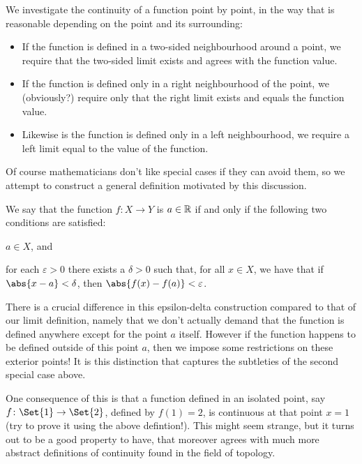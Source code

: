 We investigate the continuity of a function point by point, in the way that is reasonable depending on the point and its surrounding:
\begin{itemize}
	\item If the function is defined in a two-sided neighbourhood around a point, we require that the two-sided limit exists and agrees with the function value.
	\item If the function is defined only in a right neighbourhood of the point, we (obviously?) require only that the right limit exists and equals the function value.
	\item Likewise is the function is defined only in a left neighbourhood, we require a left limit equal to the value of the function.
\end{itemize}

\noindent
Of course mathematicians don't like special cases if they can avoid them, so we attempt to construct a general definition motivated by this discussion.


\begin{definition}
	We say that the function $f \colon X \to Y$ is  $a \in \mathbb{R}$ if and only if the following two conditions are satisfied:
	\begin{romanlist}
		\item $a \in X$, and
		\item for each $\varepsilon > 0$ there exists a $\delta > 0$ such that, for all $x \in X$, we have that if $\abs{x - a} < \delta$, then $\abs{f(x) - f(a)} < \varepsilon$.
	\end{romanlist}
\end{definition}

\begin{remark}
	There is a crucial difference in this epsilon-delta construction compared to that of our limit definition, namely that we don't actually demand that the function is defined anywhere except for the point $a$ itself. However if the function happens to be defined outside of this point $a$, then we impose some restrictions on these exterior points!
	It is this distinction that captures the subtleties of the second special case above.

	One consequence of this is that a function defined in an isolated point, say $f \colon \Set{1} \to \Set{2}$, defined by $f(1) = 2$, is continuous at that point $x = 1$ (try to prove it using the above defintion!). This might seem strange, but it turns out to be a good property to have, that moreover agrees with much more abstract definitions of continuity found in the field of topology.
\end{remark}


